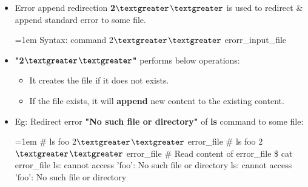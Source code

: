 \setlength{\columnsep}{3pt}
\begin{flushleft}

	\begin{itemize}
	\item Error append redirection \textbf{2{$\textgreater$}{$\textgreater$}} is used to redirect \& append standard error to some file.
	\bigskip
	\begin{tcolorbox}[breakable,notitle,boxrule=-0pt,colback=pink,colframe=pink]
		\color{black}
		\font=1em
		Syntax: command 2{$\textgreater$}{$\textgreater$} erorr\_input\_file
		\font=4pt
	\end{tcolorbox}
	\item \textbf{"2{$\textgreater$}{$\textgreater$}"} performs below operations:
	\begin{itemize}
		\item It creates the file if it does not exists.
		\item If the file exists, it will \textbf{append} new content to the existing content.
	\end{itemize}
	\item
	Eg: Redirect error \textbf{"No such file or directory"} of \textbf{ls} command to some file:
	\bigskip
	\begin{tcolorbox}[breakable,notitle,boxrule=-0pt,colback=black,colframe=black]
		\color{green}
		\font=1em
		\# ls foo 2{$\textgreater$}{$\textgreater$} error\_file
		\newline
		\# ls foo 2{$\textgreater$}{$\textgreater$} error\_file
		\newline
		\newline
		\color{yellow}
		\# Read content of error\_file
		\color{green}
		\newline
		\$ cat error\_file
		\newline
		\color{white}
		ls: cannot access 'foo': No such file or directory
		\newline
		ls: cannot access 'foo': No such file or directory
		\font=4pt
	\end{tcolorbox}

\end{itemize}
	

	
\end{flushleft}



\newpage